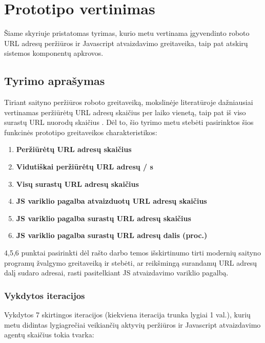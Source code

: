 \section{Prototipo vertinimas}

Šiame skyriuje pristatomas tyrimas, kurio metu vertinama įgyvendinto roboto URL adresų peržiūros ir Javascript atvaizdavimo greitaveika, taip pat atskirų sistemos komponentų apkrovos.

\subsection{Tyrimo aprašymas}

Tiriant saityno peržiūros roboto greitaveiką, mokslinėje literatūroje dažniausiai vertinamas peržiūrėtų URL adresų skaičius per laiko vienetą, taip pat iš viso surastų URL nuorodų skaičius \cite{HeritrixArchitecture}. Dėl to, šio tyrimo metu stebėti pasirinktos šios funkcinės prototipo greitaveikos charakteristikos:

\begin{enumerate}
    \item \textbf{Peržiūrėtų URL adresų skaičius}
    \item \textbf{Vidutiškai peržiūrėtų URL adresų / s}
    \item \textbf{Visų surastų URL adresų skaičius}
    \item \textbf{JS variklio pagalba atvaizduotų URL adresų skaičius}
    \item \textbf{JS variklio pagalba surastų URL adresų skaičius}
    \item \textbf{JS variklio pagalba surastų URL adresų dalis (proc.)}
\end{enumerate}

4,5,6 punktai pasirinkti dėl rašto darbo temos išskirtinumo tirti modernių saityno programų žvalgymo greitaveiką ir stebėti, ar reikšmingą surandamų URL adresų dalį sudaro adresai, rasti pasitelkiant JS atvaizdavimo variklio pagalbą.

\subsubsection{Vykdytos iteracijos}

Vykdytos 7 skirtingos iteracijos (kiekviena iteracija trunka lygiai 1 val.), kurių metu didintas lygiagrečiai veikiančių aktyvių peržiūros ir Javascript atvaizdavimo agentų skaičius tokia tvarka:

